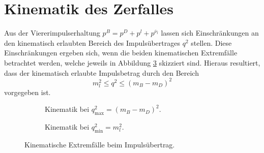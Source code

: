 \section{Kinematik des Zerfalles}
\label{sec:kinematik}
Aus der Viererimpulserhaltung $p^B = p^D + p^l + p^{\overline{\nu}_l}$ lassen sich Einschränkungen an den kinematisch erlaubten Bereich des Impulsübertrages $q^2$ stellen.
Diese Einschränkungen ergeben sich, wenn die beiden kinematischen Extremfälle betrachtet werden, welche jeweils in Abbildung \ref{fig:recoil} skizziert sind.
Hieraus resultiert, dass der kinematisch erlaubte Impulsbetrag durch den Bereich
\begin{equation}
  m_l^2 \leq q^2 \leq (m_B - m_D)^2
  \label{eqn:kinematik}
\end{equation}
vorgegeben ist.
\begin{figure}
  \centering
  \begin{subfigure}{0.48\textwidth}
    \centering
    \caption{Kinematik bei $q_\text{max}^2 = (m_B - m_D)^2$.}
    \label{fig:recoil1}
  \end{subfigure}
  \begin{subfigure}{0.48\textwidth}
    \centering
    \caption{Kinematik bei $q_\text{min}^2 = m_l^2$.}
    \label{fig:recoil2}
  \end{subfigure}
  \caption{Kinematische Extremfälle beim Impulsübertrag.}
  \label{fig:recoil}
\end{figure}

